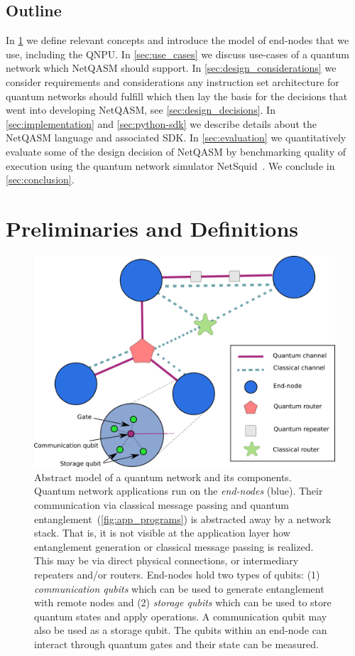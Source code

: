 \subsection{Outline}
In \cref{sec:preliminaries} we define relevant concepts and introduce the model of end-nodes that we use, including the \ac{QNPU}.
In \cref{sec:use_cases} we discuss use-cases of a quantum network which \ac{NetQASM} should support.
In \cref{sec:design_considerations} we consider requirements and considerations any instruction set architecture for quantum networks should fulfill which then lay the basis for the decisions that went into developing \ac{NetQASM}, see \cref{sec:design_decisions}.
In \cref{sec:implementation} and \cref{sec:python-sdk} we describe details about the \ac{NetQASM} language and associated SDK.
In \cref{sec:evaluation} we quantitatively evaluate some of the design decision of \ac{NetQASM} by benchmarking quality of execution using the quantum network simulator NetSquid~\cite{netsquid,coopmans2021netsquid}.
We conclude in \cref{sec:conclusion}.


\section{Preliminaries and Definitions}
\label{sec:preliminaries}

\begin{figure}[t]
    \centering
    \includegraphics[width=0.4\linewidth]{figures/netqasm/network_model.png}
    \caption{
      Abstract model of a quantum network and its components.
      Quantum network applications run on the \emph{end-nodes} (blue).
      Their communication via classical message passing and quantum entanglement~(\cref{fig:app_programs}) is abstracted away by a network stack.
      That is, it is not visible at the application layer how entanglement generation or classical message passing is realized.
      This may be via direct physical connections, or intermediary repeaters and/or routers.
      End-nodes hold two types of qubits:
        (1) \emph{communication qubits} which can be used to generate entanglement with remote nodes and
        (2) \emph{storage qubits} which can be used to store quantum states and apply operations.
      A communication qubit may also be used as a storage qubit.
      The qubits within an end-node can interact through quantum gates and their state can be measured.
    }
    \label{fig:network_model}
\end{figure}

